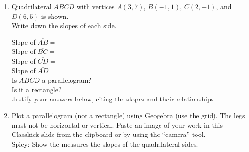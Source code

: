 \begin{enumerate}
\item Quadrilateral $ABCD$ with vertices $A(3,7)$, $B(-1,1)$, $C(2,-1)$, and $D(6,5)$ is shown. \\[0.5cm]
Write down the slopes of each side.
\begin{multicols}{2}
  Slope of $\overline{AB}=$\\[0.8cm]
  Slope of $\overline{BC}=$\\[0.8cm]
  Slope of $\overline{CD}=$\\[0.8cm]
  Slope of $\overline{AD}=$\\[0.8cm]
  Is $ABCD$ a parallelogram? \\[0.8cm]
  Is it a rectangle? \\[0.8cm]
  Justify your answers below, citing the slopes and their relationships.
  \begin{flushright}
    \end{flushright}
  \end{multicols}

\item Plot a parallelogram (not a rectangle) using Geogebra (use the grid). The legs must not be horizontal or vertical. Paste an image of your work in this Classkick slide from the clipboard or by using the ``camera'' tool.\\[0.25cm]
Spicy: Show the measures the slopes of the quadrilateral sides.


\end{enumerate}
